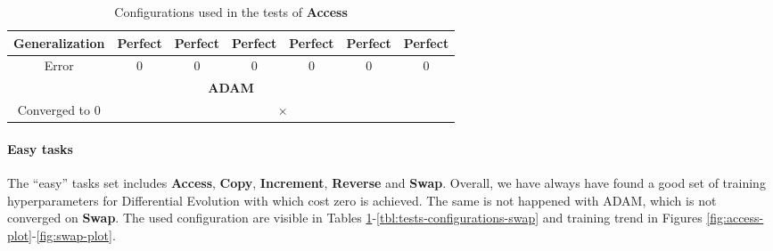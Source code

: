 \begin{table}[!h]
\begin{tabular}{|c|c|c|c|c|c|c|}
		Generalization & Perfect & Perfect & Perfect & Perfect & Perfect & Perfect \\ \hline
		Error & 0 & 0 & 0 & 0 & 0 & 0 \\ \hline\hline
		
		\multicolumn{7}{|c|}{\textbf{ADAM}} \\ \hline
		Converged to 0 & \multicolumn{6}{|c|}{$\times$} \\ \hline
 	\end{tabular}
	\caption{Configurations used in the tests of \textbf{Access}}
	\label{tbl:tests-configurations-access}
\end{table}

\paragraph{Easy tasks}
The ``easy'' tasks set includes \textbf{Access}, \textbf{Copy}, \textbf{Increment}, \textbf{Reverse} and \textbf{Swap}. Overall, we have always have found a good set of training hyperparameters for Differential Evolution with which cost zero is achieved. The same is not happened with ADAM, which is not converged on \textbf{Swap}. The used configuration are visible in Tables \ref{tbl:tests-configurations-access}-\ref{tbl:tests-configurations-swap} and training trend in Figures \ref{fig:access-plot}-\ref{fig:swap-plot}.

